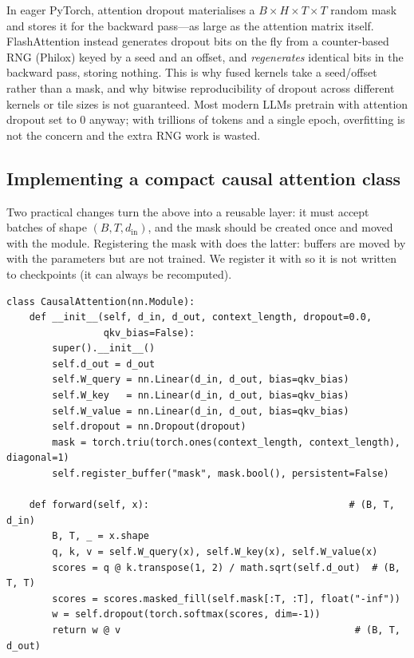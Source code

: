 \begin{systemslens}
In eager PyTorch, attention dropout materialises a $B\times H\times T\times T$ random mask and
stores it for the backward pass---as large as the attention matrix itself. FlashAttention instead
generates dropout bits on the fly from a counter-based RNG (Philox) keyed by a seed and an offset,
and \emph{regenerates} identical bits in the backward pass, storing nothing. This is why fused
kernels take a seed/offset rather than a mask, and why bitwise reproducibility of dropout across
different kernels or tile sizes is not guaranteed. Most modern LLMs pretrain with attention dropout
set to 0 anyway; with trillions of tokens and a single epoch, overfitting is not the concern and
the extra RNG work is wasted.
\end{systemslens}

\subsection{Implementing a compact causal attention class}
Two practical changes turn the above into a reusable layer: it must accept batches of shape
$(B,T,d_{\text{in}})$, and the mask should be created once and moved with the module. Registering the
mask with  does the latter: buffers are moved by  with the
parameters but are not trained. We register it with  so it is not written to
checkpoints (it can always be recomputed).

\begin{lstlisting}[caption={Batched causal attention with dropout (Lab 4, Part C).},label={lst:attention:causal}]
class CausalAttention(nn.Module):
    def __init__(self, d_in, d_out, context_length, dropout=0.0,
                 qkv_bias=False):
        super().__init__()
        self.d_out = d_out
        self.W_query = nn.Linear(d_in, d_out, bias=qkv_bias)
        self.W_key   = nn.Linear(d_in, d_out, bias=qkv_bias)
        self.W_value = nn.Linear(d_in, d_out, bias=qkv_bias)
        self.dropout = nn.Dropout(dropout)
        mask = torch.triu(torch.ones(context_length, context_length), diagonal=1)
        self.register_buffer("mask", mask.bool(), persistent=False)

    def forward(self, x):                                   # (B, T, d_in)
        B, T, _ = x.shape
        q, k, v = self.W_query(x), self.W_key(x), self.W_value(x)
        scores = q @ k.transpose(1, 2) / math.sqrt(self.d_out)  # (B, T, T)
        scores = scores.masked_fill(self.mask[:T, :T], float("-inf"))
        w = self.dropout(torch.softmax(scores, dim=-1))
        return w @ v                                         # (B, T, d_out)
\end{lstlisting}

